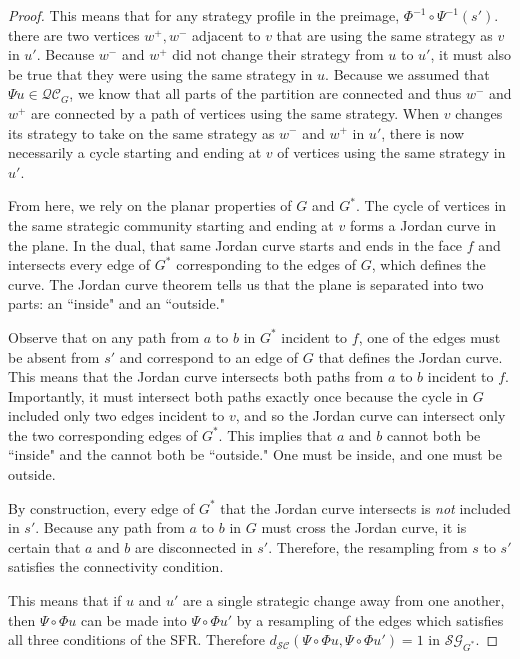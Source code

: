 \documentclass{article}
\begin{document}
\begin{proof}
        This means that for any strategy profile in the preimage, $\Phi^{-1}\circ\Psi^{-1}(s')$. there are two vertices $w^+,w^-$ adjacent to $v$ that are using the same strategy as $v$ in $u'$. Because $w^-$ and $w^+$ did not change their strategy from $u$ to $u'$, it must also be true that they were using the same strategy in $u$. Because we assumed that $\Psi u\in \mathcal{QC}_{G}$, we know that all parts of the partition are connected and thus $w^-$ and $w^+$ are connected by a path of vertices using the same strategy. When $v$ changes its strategy to take on the same strategy as $w^-$ and $w^+$ in $u'$, there is now necessarily a cycle starting and ending at $v$ of vertices using the same strategy in $u'$. 

        From here, we rely on the planar properties of $G$ and $G^*$. The cycle of vertices in the same strategic community starting and ending at $v$ forms a Jordan curve in the plane. In the dual, that same Jordan curve starts and ends in the face $f$ and intersects every edge of $G^*$ corresponding to the edges of $G$, which defines the curve. The Jordan curve theorem tells us that the plane is separated into two parts: an ``inside" and an ``outside." 

        Observe that on any path from $a$ to $b$ in $G^*$ incident to $f$, one of the edges must be absent from $s'$ and correspond to an edge of $G$ that defines the Jordan curve. This means that the Jordan curve intersects both paths from $a$ to $b$ incident to $f$. Importantly, it must intersect both paths exactly once because the cycle in $G$ included only two edges incident to $v$, and so the Jordan curve can intersect only the two corresponding edges of $G^*.$ This implies that $a$ and $b$ cannot both be ``inside" and the cannot both be ``outside." One must be inside, and one must be outside. 

        By construction, every edge of $G^*$ that the Jordan curve intersects is \textit{not} included in $s'$. Because any path from $a$ to $b$ in $G$ must cross the Jordan curve, it is certain that $a$ and $b$ are disconnected in $s'$. Therefore, the resampling from $s$ to $s'$ satisfies the connectivity condition. 

        This means that if $u$ and $u'$ are a single strategic change away from one another, then $\Psi\circ\Phi u$ can be made into $\Psi \circ \Phi u'$ by a resampling of the edges which satisfies all three conditions of the SFR. Therefore $d_{\mathcal{SC}}(\Psi\circ\Phi u,\Psi\circ\Phi u')=1$ in $\mathcal{SG}_{G^*}$. 
        \end{proof}
\end{document}
